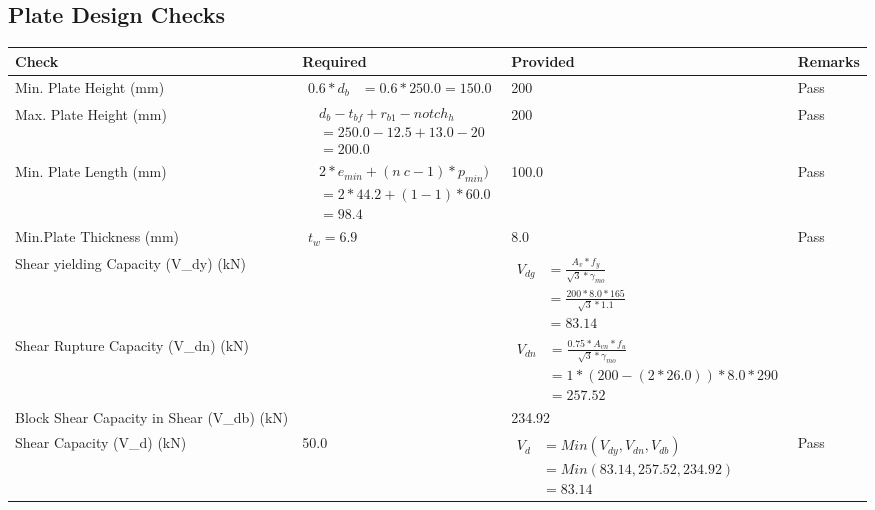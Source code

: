 \documentclass{article}%
\begin{document}
\subsection{Plate Design Checks}%
\label{subsec:PlateDesignChecks}%
\renewcommand{\arraystretch}{1.2}%
\begin{longtable}{|p{4cm}|p{5cm}|p{5.5cm}|p{1.5cm}|}%
\hline%
\rowcolor{OsdagGreen}%
Check&Required&Provided&Remarks\\%
\hline%
\endhead%
\hline%
Min. Plate Height (mm)&$\begin{aligned}0.6 * d_b&= 0.6 * 250.0=150.0\end{aligned}$&200&Pass\\%
\hline%
Max. Plate Height (mm)&$\begin{aligned} &d_b - t_{bf} + r_{b1} - notch_h\\ &=250.0-12.5+13.0-20\\ &=200.0\end{aligned}$&200&Pass\\%
\hline%
Min. Plate Length (mm)&$\begin{aligned} &2*e_{min} + (n~c-1) * p_{min})\\ &=2*44.2+(1-1) * 60.0\\ &=98.4\end{aligned}$&100.0&Pass\\%
\hline%
Min.Plate Thickness (mm)&$\begin{aligned} t_w=6.9\end{aligned}$&8.0&Pass\\%
\hline%
Shear yielding Capacity (V\_dy) (kN)&&$\begin{aligned} V_{dg} &= \frac{A_v*f_y}{\sqrt{3}*\gamma_{mo}}\\ &=\frac{200*8.0*165}{\sqrt{3}*1.1}\\ &=83.14\end{aligned}$&\\%
\hline%
Shear Rupture Capacity (V\_dn) (kN)&&$\begin{aligned} V_{dn} &= \frac{0.75*A_{vn}*f_u}{\sqrt{3}*\gamma_{mo}}\\ &=1*(200-(2*26.0))*8.0*290\\ &=257.52\end{aligned}$&\\%
\hline%
Block Shear Capacity in Shear (V\_db) (kN)&&234.92&\\%
\hline%
Shear Capacity (V\_d) (kN)&50.0&$\begin{aligned} V_d &= Min(V_{dy},V_{dn},V_{db})\\ &= Min(83.14,257.52,234.92)\\ &=83.14\end{aligned}$&Pass\\%

\end{longtable}
\end{document}
